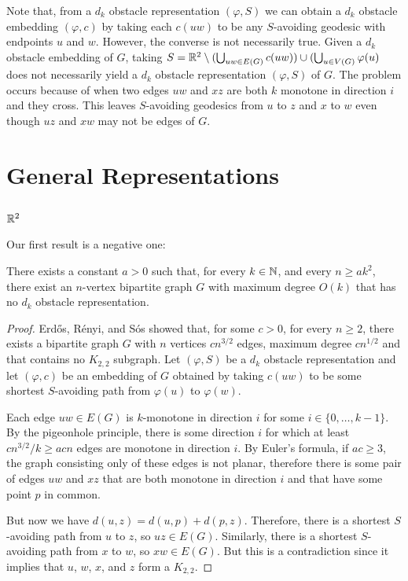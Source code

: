 \documentclass{patmorin}
\begin{document}
Note that, from a $d_k$ obstacle representation $(\varphi, S)$ we
can obtain a $d_k$ obstacle embedding $(\varphi, c)$ by taking each
$c(uw)$ to be any $S$-avoiding geodesic with endpoints $u$ and $w$.
However, the converse is not necessarily true.  Given a $d_k$ obstacle
embedding of $G$, taking $S=\mathbb{R}^2\setminus (\bigcup_{uw\in E(G)}c(uw))\cup
(\bigcup_{u\in V(G)} \varphi(u)$ does not necessarily yield a $d_k$ obstacle
representation $(\varphi,S)$ of $G$.  The problem occurs because of
 when two edges $uw$ and $xz$ are both $k$ monotone in
direction $i$ and they cross. This leaves $S$-avoiding geodesics from $u$
to $z$ and $x$ to $w$ even though $uz$ and $xw$ may not be edges of $G$.



\section{General Representations}

\subsection{$\mathbb{R}^2$}

Our first result is a negative one:

\begin{thm}
  There exists a constant $a>0$ such that, for every $k\in \mathbb{N}$, and every
  $n\ge ak^2$, there exist an $n$-vertex bipartite graph $G$ with maximum
  degree $O(k)$ that has no $d_k$ obstacle representation.
\end{thm}

\begin{proof}
   Erd\H{o}s, R\'enyi, and S\'os \cite{erdos.renyi.ea:1966} showed that,
   for some $c>0$, for every $n\ge 2$, there exists a bipartite graph
   $G$ with $n$ vertices $cn^{3/2}$ edges, maximum degree $cn^{1/2}$
   and that contains no $K_{2,2}$ subgraph.  Let $(\varphi,S)$ be a
   $d_k$ obstacle representation and let $(\varphi,c)$
   be an embedding of $G$ obtained by taking $c(uw)$ to be some shortest
   $S$-avoiding path from $\varphi(u)$ to $\varphi(w)$.

   Each edge $uw\in E(G)$ is $k$-monotone in direction $i$ for some
   $i\in\{0,\ldots,k-1\}$.  By the pigeonhole principle, there is
   some direction $i$ for which at least $cn^{3/2}/k\ge acn$ edges
   are monotone in direction $i$.  By Euler's formula, if $ac\ge 3$,
   the graph consisting only of these edges is not planar, therefore
   there is some pair of edges $uw$ and $xz$ that are both monotone in
   direction $i$ and that have some point $p$ in common.

   But now we have $d(u,z)=d(u,p)+d(p,z)$.  Therefore, there is a shortest
   $S$-avoiding path from $u$ to $z$, so $uz\in E(G)$.  Similarly, there
   is a shortest $S$-avoiding path from $x$ to $w$, so $xw\in E(G)$.
   But this is a contradiction since it implies that $u$, $w$, $x$,
   and $z$ form a $K_{2,2}$.
\end{proof}
\end{document}
